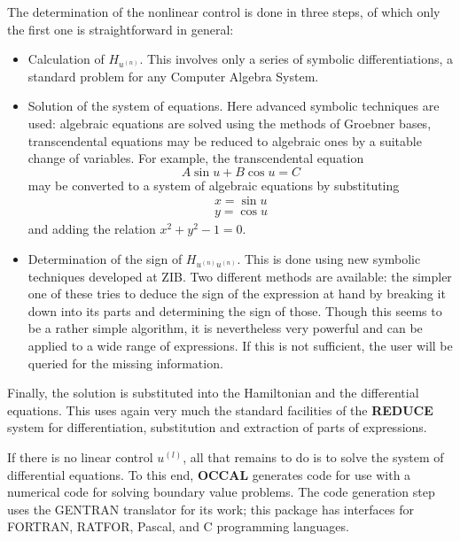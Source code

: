 \documentclass[12pt,a4paper]{article}
\newcommand{\OCCAL}{{\sf\bf OCCAL}}
\newcommand{\REDUCE}{{\sf\bf REDUCE}}
\newcommand{\FORTRAN}{{\sf FORTRAN}}
\newcommand{\RATFOR}{{\sf RATFOR}}
\newcommand{\Pascal}{{\sc Pascal}}
\newcommand{\C}{{\sf C}}
\newcommand{\GENTRAN}{{\sf GENTRAN}}
\begin{document}
The determination of the nonlinear control is done in three steps, of
which only the first one is straightforward in general:
\begin{itemize}
  \item Calculation of $H_{u^{(n)}}$.
        This involves only a series of symbolic differentiations, a
        standard problem for any Computer Algebra System.
  \item Solution of the system of equations.
        Here advanced symbolic techniques are used: algebraic
        equations are solved using the methods of Groebner bases,
        transcendental equations may be reduced to algebraic ones by a
        suitable change of variables. For example, the transcendental
        equation
        \begin{equation}
          A \sin u + B \cos u = C \label{sin-cos}
        \end{equation}
        may be converted to a system of algebraic equations by substituting
        \begin{eqnarray*}
          x = \sin u \\
          y = \cos u
        \end{eqnarray*}
      and adding the relation $x^{2}+y^{2}-1=0$.
      \typeout{******************************}
      \typeout{******************************}
  \item Determination of the sign of $H_{u^{(n)}u^{(n)}}$.
        This is done using new symbolic techniques developed at ZIB.
        Two different methods are available: the simpler one of these
        tries to deduce the sign of the expression at hand by breaking
        it down into its parts and determining the sign of those.
        Though this seems to be a rather simple algorithm, it is
        nevertheless very powerful and can be applied to a wide range
        of expressions.  If this is not sufficient, the user will be
        queried for the missing information.
%
\end{itemize}
Finally, the solution is substituted into the Hamiltonian and the
differential equations. This uses again very much the standard
facilities of the \REDUCE{} system for differentiation, substitution
and extraction of parts of expressions.

If there is no linear control $u^{(l)}$, all that remains to do is to
solve the system of differential equations. To this end, \OCCAL{}
generates code for use with a numerical code for solving boundary
value problems. The code generation step uses the \GENTRAN{}
translator for its work; this package has interfaces for \FORTRAN,
\RATFOR, \Pascal, and \C{} programming languages.  
\end{document}
